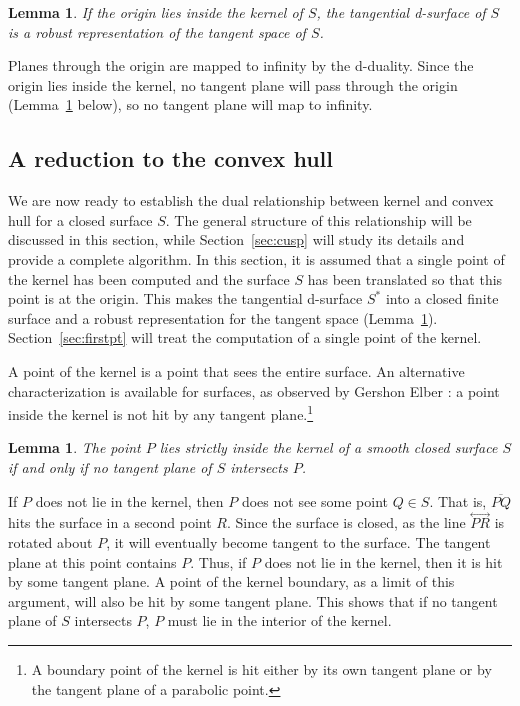 \documentclass[12pt]{article}
\newcommand{\QED}{\vrule height 1.4ex width 1.0ex depth -.1ex\ \vspace{.3in}} %
\newcommand{\lyne}[1]{\mbox{$\stackrel{\textstyle \leftrightarrow}{#1}$}}
\newcommand{\seg}[1]{\mbox{$\overline{#1}$}}
\newcommand{\prf}{\noindent{{\bf Proof}:\ \ \ }}
\newtheorem{lemma}[theorem]{Lemma}
\begin{document}
\begin{lemma}
\label{lem:drobust}
If the origin lies inside the kernel of $S$,
the tangential d-surface of $S$ is a robust representation of the tangent space of $S$.
\end{lemma}
\prf
Planes through the origin are mapped to infinity by the d-duality.
Since the origin lies inside the kernel,
no tangent plane will pass through the origin (Lemma~\ref{lem:primalkernelchar} below), 
so no tangent plane will map to infinity.
\QED


\subsection{A reduction to the convex hull}
\label{sec:reduction}

We are now ready to establish the dual relationship between kernel and convex hull
for a closed surface $S$.
The general structure of this relationship will be discussed in this section,
while Section~\ref{sec:cusp} will study its details and provide a complete algorithm.
In this section, it is assumed that a single point of the kernel has been computed and the surface $S$
has been translated so that this point is at the origin.
This makes the tangential d-surface $S^*$ into a closed finite surface
and a robust representation for the tangent space (Lemma~\ref{lem:drobust}).
Section~\ref{sec:firstpt} will treat the computation of a single point of the kernel.

A point of the kernel is a point that sees the entire surface.
An alternative characterization is available for surfaces,
as observed by Gershon Elber \cite{elber02}:
a point inside the kernel is not hit by any tangent plane.\footnote{A boundary point
	of the kernel is hit either by its own tangent plane or by the tangent plane 
	of a parabolic point.}

\begin{lemma}
\label{lem:primalkernelchar}
The point $P$ lies strictly inside the kernel of a smooth closed surface $S$ if and only if 
no tangent plane of $S$ intersects $P$.
\end{lemma}
\prf
If $P$ does not lie in the kernel,
then $P$ does not see some point $Q \in S$.
That is, $\seg{PQ}$ hits the surface in a second point $R$.
Since the surface is closed, 
as the line $\lyne{PR}$ is rotated about $P$,
it will eventually become tangent to the surface.
The tangent plane at this point contains $P$.
Thus, if $P$ does not lie in the kernel, then it is hit by some tangent plane.
A point of the kernel boundary, as a limit of this argument, will also be hit by some tangent plane.
This shows that if no tangent plane of $S$ intersects $P$, 
$P$ must lie in the interior of the kernel.
\end{document}
